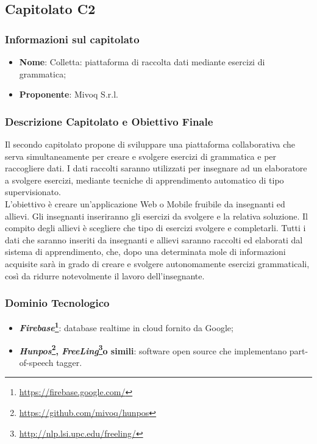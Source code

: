 \subsection{Capitolato C2}\label{C2}

\subsubsection{Informazioni sul capitolato}

\begin{itemize}
	\item \textbf{Nome}: Colletta: piattaforma di raccolta dati mediante esercizi di grammatica;
	\item \textbf{Proponente}: Mivoq S.r.l.
\end{itemize}

\subsubsection{Descrizione Capitolato e Obiettivo Finale}
Il secondo capitolato propone di sviluppare una piattaforma collaborativa che serva simultaneamente per 
creare e svolgere esercizi di grammatica e per raccogliere dati. I dati raccolti saranno utilizzati per insegnare ad un elaboratore a svolgere esercizi, mediante tecniche di apprendimento automatico di tipo supervisionato\glossario.\\
L'obiettivo è creare un'applicazione Web o Mobile fruibile da insegnanti ed allievi. Gli insegnanti inseriranno gli esercizi da svolgere e la relativa soluzione. Il compito degli allievi è scegliere che tipo di esercizi svolgere e completarli. Tutti i dati che saranno inseriti da insegnanti e allievi saranno raccolti ed elaborati dal sistema di apprendimento, che, dopo una determinata mole di informazioni acquisite sarà in grado di creare e svolgere autonomamente esercizi grammaticali, così da ridurre notevolmente il lavoro dell'insegnante.

\subsubsection{Dominio Tecnologico}\label{C2_DomTec}
\begin{itemize}
	\item \textbf{\textit{Firebase}\footnote{\url{https://firebase.google.com/}}\glossario}: database realtime in cloud fornito da Google;
	\item \textbf{\textit{Hunpos}\footnote{\url{https://github.com/mivoq/hunpos}}\glossario, \textit{FreeLing}\footnote{\url{http://nlp.lsi.upc.edu/freeling/}}\glossario o simili}: software open source che implementano part-of-speech tagger\glossario.
\end{itemize}

